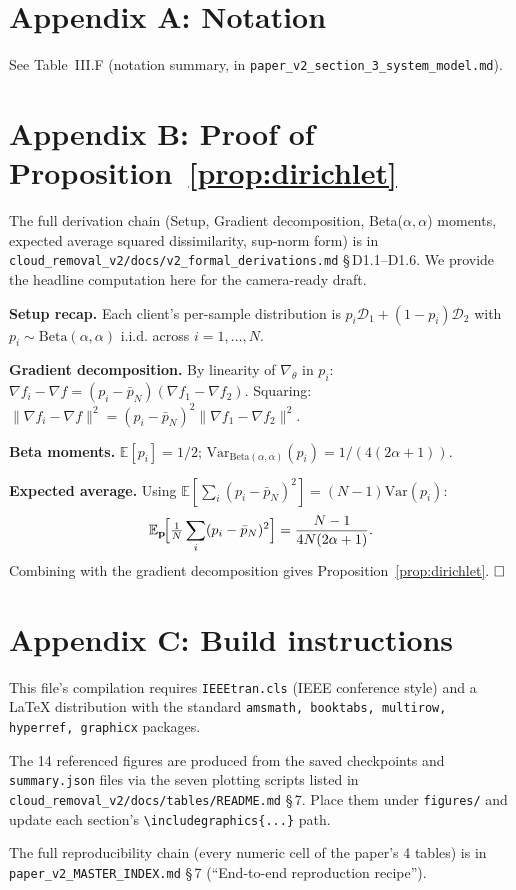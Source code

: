 \documentclass[conference]{IEEEtran}
\newcommand{\Var}{\mathrm{Var}}
\newcommand{\E}{\mathbb{E}}
\newcommand{\Beta}{\mathrm{Beta}}
\newcommand{\D}{\mathcal{D}}
\begin{document}



\appendix
\section*{Appendix A: Notation}
See Table~III.F (notation summary, in \texttt{paper\_v2\_section\_3\_system\_model.md}).

\section*{Appendix B: Proof of Proposition~\ref{prop:dirichlet}}
The full derivation chain (Setup, Gradient decomposition,
Beta($\alpha,\alpha$) moments, expected average squared
dissimilarity, sup-norm form) is in
\texttt{cloud\_removal\_v2/docs/v2\_formal\_derivations.md}
\S\,D1.1--D1.6. We provide the headline computation here for
the camera-ready draft.

\medskip
\noindent\textbf{Setup recap.} Each client's per-sample distribution
is $p_i \D_1 + (1-p_i) \D_2$ with $p_i \sim \Beta(\alpha,\alpha)$ i.i.d.
across $i = 1, \ldots, N$.

\medskip
\noindent\textbf{Gradient decomposition.} By linearity of
$\nabla_\theta$ in $p_i$:
$\nabla f_i - \nabla f = (p_i - \bar p_N)(\nabla f_1 - \nabla f_2)$.
Squaring:
$\| \nabla f_i - \nabla f \|^2
= (p_i - \bar p_N)^2 \|\nabla f_1 - \nabla f_2\|^2$.

\medskip
\noindent\textbf{Beta moments.} $\E[p_i] = 1/2$;
$\Var_{\Beta(\alpha,\alpha)}(p_i) = 1/(4(2\alpha+1))$.

\medskip
\noindent\textbf{Expected average.} Using
$\E[\sum_i (p_i - \bar p_N)^2] = (N-1)\Var(p_i)$:
$$
\E_{\mathbf{p}}\!\Bigl[\tfrac{1}{N}\sum_i (p_i - \bar p_N)^2\Bigr]
= \frac{N-1}{4N(2\alpha+1)}.
$$
Combining with the gradient decomposition gives
Proposition~\ref{prop:dirichlet}. $\hfill\square$

\section*{Appendix C: Build instructions}

This file's compilation requires \texttt{IEEEtran.cls} (IEEE
conference style) and a \LaTeX{} distribution with the standard
\texttt{amsmath, booktabs, multirow, hyperref, graphicx} packages.

The 14 referenced figures are produced from the saved checkpoints
and \texttt{summary.json} files via the seven plotting scripts
listed in \texttt{cloud\_removal\_v2/docs/tables/README.md}
\S\,7. Place them under \texttt{figures/} and update each
section's \texttt{\textbackslash includegraphics\{...\}} path.

The full reproducibility chain (every numeric cell of the paper's
4 tables) is in \texttt{paper\_v2\_MASTER\_INDEX.md} \S\,7
(``End-to-end reproduction recipe'').
\end{document}
